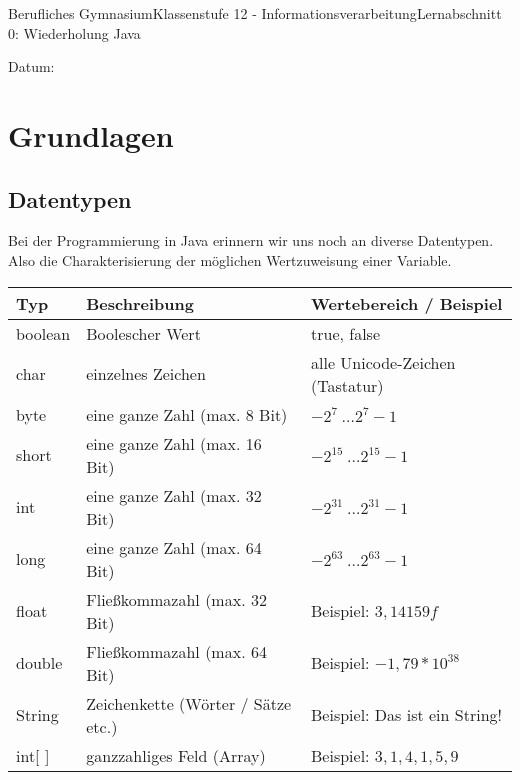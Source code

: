 \documentclass[11pt,twocolumn,oneside,openany,headings=optiontotoc,11pt,numbers=noenddot]{article}
\begin{document}
	\begin{worksheet}{Berufliches Gymnasium}{Klassenstufe 12 - Informationsverarbeitung}{Lernabschnitt 0: Wiederholung Java}
		\begin{framed}
			Datum:
		\end{framed}
		\section{Grundlagen}
		\subsection{Datentypen}
		Bei der Programmierung in Java erinnern wir uns noch an diverse Datentypen. Also die Charakterisierung der möglichen Wertzuweisung einer Variable.\\
		\begin{tabularx}{0.48\textwidth}{lXX}
			\textbf{Typ} & \textbf{Beschreibung} & \textbf{Wertebereich / Beispiel}\\
			\hline
			\hline
			boolean & Boolescher Wert & true, false\\
			\hline
			char & einzelnes Zeichen & alle Unicode-Zeichen (Tastatur)\\
			\hline
			byte & eine ganze Zahl (max. 8 Bit) & \(-2^7\ \ldots 2^7-1\)\\
			\hdashline
			short & eine ganze Zahl (max. 16 Bit) & \(-2^{15}\ \ldots 2^{15}-1\)\\
			\hdashline
			int & eine ganze Zahl (max. 32 Bit) & \(-2^{31}\ \ldots 2^{31}-1\)\\
			\hdashline
			long & eine ganze Zahl (max. 64 Bit) & \(-2^{63}\ \ldots 2^{63}-1\)\\
			\hline
			float & Fließkommazahl (max. 32 Bit) & Beispiel: \(3,14159f\)\\
			\hdashline
			double & Fließkommazahl (max. 64 Bit) & Beispiel: \(-1,79 * 10^{38}\)\\
			\hline
			String & Zeichenkette (Wörter / Sätze etc.) & Beispiel: \glqq{}Das ist ein String!\grqq{}\\
			\hdashline
			int[ ] & ganzzahliges Feld (Array) & Beispiel: \({3,1,4,1,5,9}\)\\
			\hline
			\hline
		\end{tabularx}
	\end{worksheet}
\end{document}

